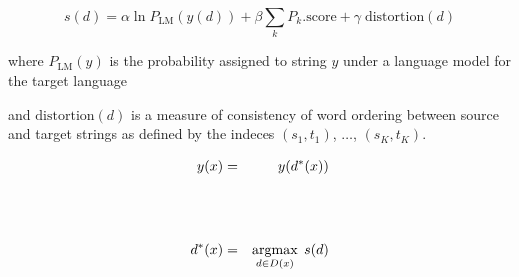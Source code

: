 {\vfill
$$s(d) = \alpha \ln P_\mathrm{LM}(y(d)) + \beta \sum_k P_k.\mathrm{score} + \gamma \;\mathrm{distortion}(d)$$

\vfill
where $P_{\mathrm{LM}}(y)$ is the probability assigned to string $y$ under a language model for the target language

\vfill
and $\mathrm{distortion}(d)$ is a measure of consistency of word ordering between source and target strings as defined by
the indeces $(s_1,t_1)$, $\ldots$, $(s_K,t_K)$.


\begin{eqnarray*}
  y(x) & = & y(d^*(x)) \\
  \\
  \\
  \\
  d^*(x) & = & \operatorname*{argmax}_{d \in D(x)} \;s(d)
\end{eqnarray*}

}

